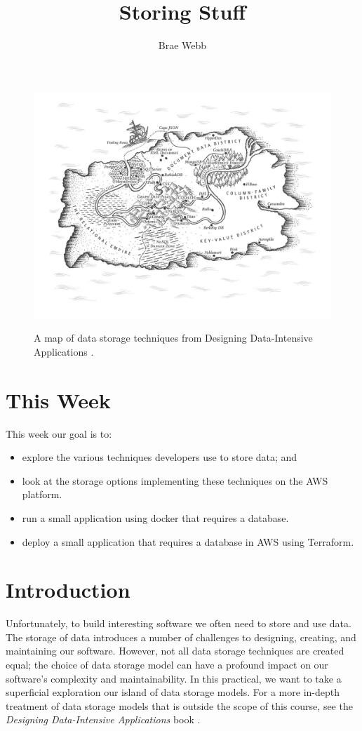 \documentclass{csse4400}
\title{Storing Stuff}
\author{Brae Webb}
\date{\week{3}}
\begin{document}
\maketitle

\begin{figure}[h]
  \href{https://www.oreilly.com/library/view/designing-data-intensive-applications/9781491903063/ch02.html}{
    \includegraphics[width=\textwidth]{images/databases}
  }
\caption{A map of data storage techniques from Designing Data-Intensive Applications \cite{data-intensive}.}
\end{figure}


\section{This Week}
This week our goal is to:
\begin{itemize}
  \item explore the various techniques developers use to store data; and
  \item look at the storage options implementing these techniques on the AWS platform.
  \item run a small application using docker that requires a database.
  \item deploy a small application that requires a database in AWS using Terraform.
\end{itemize}

\section{Introduction}
Unfortunately, to build interesting software we often need to store and use data.
The storage of data introduces a number of challenges to designing, creating, and maintaining our software.
However, not all data storage techniques are created equal;
the choice of data storage model can have a profound impact on our software's complexity and maintainability.
In this practical, we want to take a superficial exploration our island of data storage models.
For a more in-depth treatment of data storage models that is outside the scope of this course,
see the \textit{Designing Data-Intensive Applications} book \cite{data-intensive}.
\end{document}
